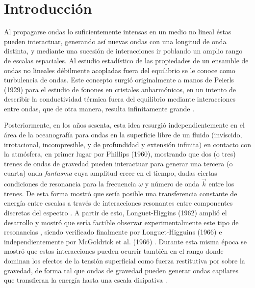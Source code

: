 \chapter{Introducción} %
\thispagestyle{plain} 

 

Al propagarse ondas lo suficientemente intensas en un medio no lineal éstas pueden interactuar, generando así nuevas ondas con una longitud de onda distinta, y mediante una sucesión de interacciones ir poblando un amplio rango de escalas espaciales. Al estudio estadístico de las propiedades de un ensamble de ondas no lineales débilmente acopladas fuera del equilibrio se le conoce como turbulencia de ondas. \cite{falconLaboratoryExperimentsWave2010} Este concepto surgió originalmente a manos de Peierls (1929) para el estudio de fonones en cristales anharmónicos, en un intento de describir la conductividad térmica fuera del equilibrio mediante interacciones entre ondas, que de otra manera, resulta infinitamente grande  \cite{peierls1929kinetischen}.  %

Posteriormente, en los años sesenta, esta idea resurgió independientemente en el área de la oceanografía para ondas en la superficie libre de un fluido (invíscido, irrotacional, incompresible, y de profundidad y extensión infinita) en contacto con la atmósfera, en primer lugar por Phillips (1960),  mostrando que dos (o tres) trenes de ondas de gravedad pueden interactuar para generar una tercera (o cuarta) onda \textit{fantasma} cuya amplitud crece en el tiempo, dadas ciertas condiciones de resonancia para la frecuencia $\omega$ y número de onda $\vec k$ entre los trenes. De esta forma mostró que sería posible una transferencia constante de energía entre escalas a través de interacciones resonantes entre componentes discretas del espectro \cite{phillipsDynamicsUnsteadyGravity1960, phillipsDynamicsUnsteadyGravity1961a}. A partir de esto, Longuet-Higgins (1962) amplió el desarrollo y mostró que sería factible observar experimentalmente este tipo de resonancias \cite{longuet-higginsResonantInteractionsTwo1962}, siendo verificado finalmente por Longuet-Higguins (1966) \cite{longuet-higginsExperimentThirdorderResonant1966} e independientemente por McGoldrick et al. (1966) \cite{mcgoldrickMeasurementsThirdorderResonant1966}. Durante esta misma época se mostró que estas interacciones pueden ocurrir también en el rango donde dominan los efectos de la tensión superficial como fuerza restitutiva por sobre la gravedad, de forma tal que ondas de gravedad pueden generar ondas capilares que transfieran la energía hasta una escala disipativa  \cite{longuet-higginsGenerationCapillaryWaves1963, mcgoldrickResonantInteractionsCapillarygravity1965}.   

